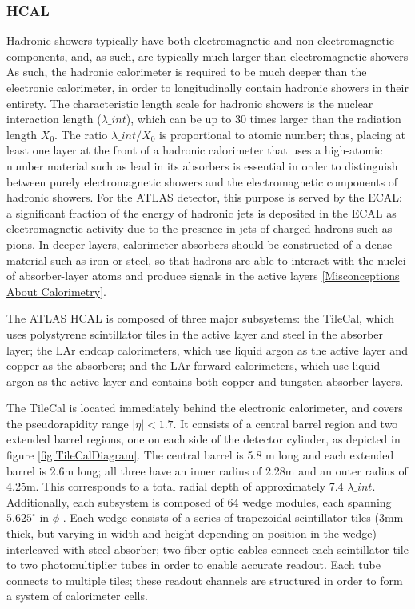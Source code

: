\subsubsection{HCAL} \label{sec:HCAL} 

Hadronic showers typically have both electromagnetic and non-electromagnetic components, and, as such, are typically much larger than electromagnetic showers  As such, the hadronic calorimeter is required to be much deeper than the electronic calorimeter, in order to longitudinally contain hadronic showers in their entirety. The characteristic length scale for hadronic showers is the nuclear interaction length ($\lambda\_{int}$), which can be up to 30 times larger than the radiation length $X_0$. The ratio $\lambda\_{int} / X_0 $ is proportional to atomic number; thus, placing at least one layer at the front of a hadronic calorimeter that uses a high-atomic number material such as lead in its absorbers is essential in order to distinguish between purely electromagnetic showers and the electromagnetic components of hadronic showers. For the ATLAS detector, this purpose is served by the ECAL: a significant fraction of the energy of hadronic jets is deposited in the ECAL as electromagnetic activity due to the presence in jets of charged hadrons such as pions. In deeper layers, calorimeter absorbers should be constructed of a dense material such as iron or steel, so that hadrons are able to interact with the nuclei of absorber-layer atoms and produce signals in the active layers \ref{Misconceptions About Calorimetry}.  

The ATLAS HCAL is composed of three major subsystems: the TileCal, which uses polystyrene scintillator tiles in the active layer and steel in the absorber layer; the LAr endcap calorimeters, which use liquid argon as the active layer and copper as the absorbers; and the LAr forward calorimeters, which use liquid argon as the active layer and contains both copper and tungsten absorber layers.

The TileCal is located immediately behind the electronic calorimeter, and covers the pseudorapidity range $|\eta |< 1.7$. It consists of a central barrel region and two extended barrel regions, one on each side of the detector cylinder, as depicted in figure \ref{fig:TileCalDiagram}. The central barrel is 5.8 m long and each extended barrel is 2.6m long; all three have an inner radius of 2.28m and an outer radius of 4.25m. This corresponds to a total radial depth of approximately 7.4 $\lambda\_{int}$. Additionally, each subsystem is composed of 64 wedge modules, each spanning $5.625 ^{\circ}$ in $\phi$ . Each wedge consists of a series of trapezoidal scintillator tiles (3mm thick, but varying in width and height depending on position in the wedge) interleaved with steel absorber; two fiber-optic cables connect each scintillator tile to two photomultiplier tubes in order to enable accurate readout. Each tube connects to multiple tiles; these readout channels are structured in order to form a system of calorimeter cells. 

